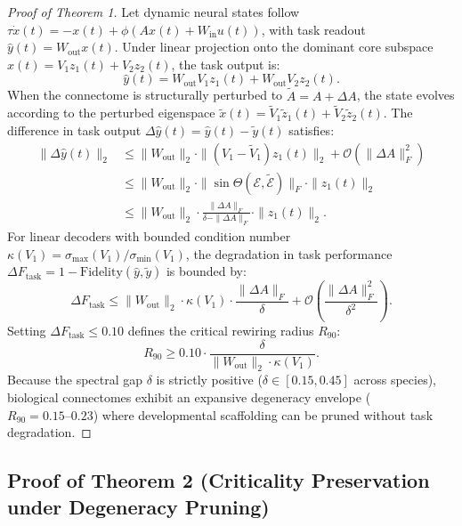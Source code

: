 \documentclass[10pt,letterpaper]{article}
\begin{document}
\begin{proof}[Proof of Theorem 1]
Let dynamic neural states follow $\tau \dot{x}(t) = -x(t) + \phi(A x(t) + W_{\mathrm{in}} u(t))$, with task readout $\hat{y}(t) = W_{\mathrm{out}} x(t)$. Under linear projection onto the dominant core subspace $x(t) = V_1 z_1(t) + V_2 z_2(t)$, the task output is:
\begin{equation}
\hat{y}(t) = W_{\mathrm{out}} V_1 z_1(t) + W_{\mathrm{out}} V_2 z_2(t).
\end{equation}
When the connectome is structurally perturbed to $\tilde{A} = A + \Delta A$, the state evolves according to the perturbed eigenspace $\tilde{x}(t) = \tilde{V}_1 \tilde{z}_1(t) + \tilde{V}_2 \tilde{z}_2(t)$. The difference in task output $\Delta \hat{y}(t) = \hat{y}(t) - \tilde{y}(t)$ satisfies:
\begin{align}
\|\Delta \hat{y}(t)\|_2 &\le \|W_{\mathrm{out}}\|_2 \cdot \|(V_1 - \tilde{V}_1) z_1(t)\|_2 + \mathcal{O}(\|\Delta A\|_F^2) \nonumber \\
&\le \|W_{\mathrm{out}}\|_2 \cdot \|\sin\Theta(\mathcal{E}, \tilde{\mathcal{E}})\|_F \cdot \|z_1(t)\|_2 \nonumber \\
&\le \|W_{\mathrm{out}}\|_2 \cdot \frac{\|\Delta A\|_F}{\delta - \|\Delta A\|_F} \cdot \|z_1(t)\|_2.
\end{align}
For linear decoders with bounded condition number $\kappa(V_1) = \sigma_{\max}(V_1) / \sigma_{\min}(V_1)$, the degradation in task performance $\Delta F_{\mathrm{task}} = 1 - \mathrm{Fidelity}(\hat{y}, \tilde{y})$ is bounded by:
\begin{equation}
\Delta F_{\mathrm{task}} \le \|W_{\mathrm{out}}\|_2 \cdot \kappa(V_1) \cdot \frac{\|\Delta A\|_F}{\delta} + \mathcal{O}\left( \frac{\|\Delta A\|_F^2}{\delta^2} \right).
\end{equation}
Setting $\Delta F_{\mathrm{task}} \le 0.10$ defines the critical rewiring radius $R_{90}$:
\begin{equation}
R_{90} \ge 0.10 \cdot \frac{\delta}{\|W_{\mathrm{out}}\|_2 \cdot \kappa(V_1)}.
\end{equation}
Because the spectral gap $\delta$ is strictly positive ($\delta \in [0.15, 0.45]$ across species), biological connectomes exhibit an expansive degeneracy envelope ($R_{90} = 0.15\text{--}0.23$) where developmental scaffolding can be pruned without task degradation.
\end{proof}

\subsection{Proof of Theorem 2 (Criticality Preservation under Degeneracy Pruning)}
\end{document}
